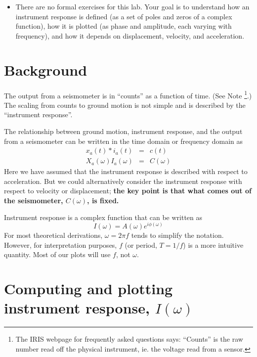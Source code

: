 \documentclass[11pt,titlepage,fleqn]{article}
\begin{document}
\begin{itemize}

\item There are no formal exercises for this lab. Your goal is to understand how an instrument response is defined (\eg as a set of poles and zeros of a complex function), how it is plotted (\eg as phase and amplitude, each varying with frequency), and how it depends on displacement, velocity, and acceleration.

\end{itemize}


\pagebreak
\section{Background}

The output from a seismometer is in ``counts'' as a function of time. (See Note \footnote{The IRIS webpage for frequently asked questions says: ``Counts'' is the raw number read off the physical instrument, ie. the voltage read from a sensor.}.) The scaling from counts to ground motion is not simple and is described by the ``instrument response''.

The relationship between ground motion, instrument response, and the output from a seismometer can be written in the time domain or frequency domain as
%
\begin{eqnarray}
x_a(t) * i_a(t) &=& c(t)
\\
X_a(\omega) I_a(\omega) &=& C(\omega)
\end{eqnarray}
%
Here we have assumed that the instrument response is described with respect to acceleration. But we could alternatively consider the instrument response with respect to velocity or displacement; {\bf the key point is that what comes out of the seismometer, $C(\omega)$, is fixed.}

Instrument response is a complex function that can be written as
%
\begin{equation}
I(\omega) = A(\omega) e^{i \phi(\omega)}
\label{Iw}
\end{equation}
%
For most theoretical derivations, $\omega = 2\pi f$ tends to simplify the notation. However, for interpretation purposes, $f$ (or period, $T = 1/f$) is a more intuitive quantity. Most of our plots will use $f$, not $\omega$.


\section{Computing and plotting instrument response, $I(\omega)$}
\end{document}
